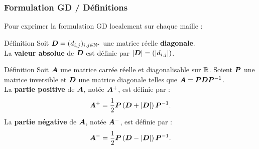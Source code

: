 \begin{frame}
\frametitle{Formulation GD / Définitions}
\vfill
Pour exprimer la formulation GD localement sur chaque maille :
\vfill
\begin{block}{Définition}
	Soit $\bm{D} = (d_{i,j})_{i,j \in \mathbb{N}^\star}$ une matrice réelle
	\textbf{diagonale}.\\ La \textbf{valeur absolue} de $\bm{D}$ est définie par
	$\left\vert\bm{D}\right\vert = (\left\vert d_{i,j}\right\vert)$.
\end{block}
\vfill
\pause
\begin{block}{Définition}
	Soit $\bm{A}$ une matrice carrée réelle et diagonalisable sur $\mathbb{R}$. Soient
	$\bm{P}$ une matrice inversible et $\bm{D}$ une matrice diagonale telles que
	$\bm{A} = \bm{P} \bm{D} \bm{P}^{-1}$.\\
	La \textbf{partie positive} de $\bm{A}$, notée $\bm{A}^{+}$, est définie par :
	\begin{align*}
		\bm{A}^{+} = \frac{1}{2} \bm{P} \left( \bm{D} + \left\vert\bm{D}\right\vert \right) \bm{P}^{-1} .
	\end{align*}
	La \textbf{partie négative} de $\bm{A}$, notée $\bm{A}^{-}$, est définie par :
	\begin{align*}
		\bm{A}^{-} = \frac{1}{2} \bm{P} \left( \bm{D} - \left\vert\bm{D}\right\vert \right) \bm{P}^{-1} .
	\end{align*}
\end{block}
\vfill
\end{frame}

